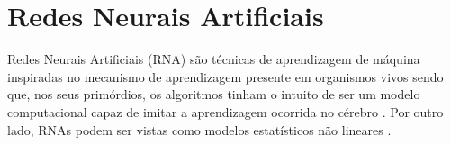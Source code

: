 \documentclass{automatextcc}
\begin{document}
\section{Redes Neurais Artificiais}

Redes Neurais Artificiais (RNA) são técnicas de aprendizagem de máquina inspiradas no mecanismo de aprendizagem presente em organismos vivos \citep{aggarwal2018} sendo que, nos seus primórdios, os algoritmos tinham o intuito de ser um modelo computacional capaz de imitar a aprendizagem ocorrida no cérebro \cite{goodfellow2016}.  Por outro lado, RNAs podem ser vistas como modelos estatísticos não lineares \citep{hastie2009}.
\end{document}
